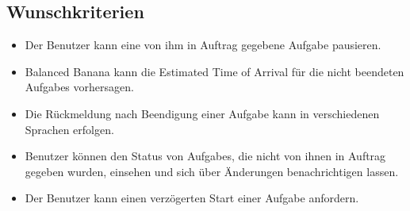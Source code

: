 \documentclass[a4paper,12pt]{article}
\begin{document}
\subsection{Wunschkriterien}
\begin{itemize}[nosep]

	\item Der \gls{Benutzer} kann eine von ihm in Auftrag gegebene \gls{Aufgabe} pausieren.	
	
	\item Balanced Banana kann die \gls{Estimated Time of Arrival} für die nicht beendeten \glspl{Aufgabe} vorhersagen.
	
	\item Die Rückmeldung nach Beendigung einer \gls{Aufgabe} kann in verschiedenen Sprachen erfolgen.
	
	\item \gls{Benutzer} können den Status von \glspl{Aufgabe}, die nicht von ihnen in Auftrag gegeben wurden, einsehen und 	sich über Änderungen benachrichtigen lassen.
	
	\item Der \gls{Benutzer} kann einen verzögerten Start einer \gls{Aufgabe} anfordern.
	
\end{itemize}
\end{document}
